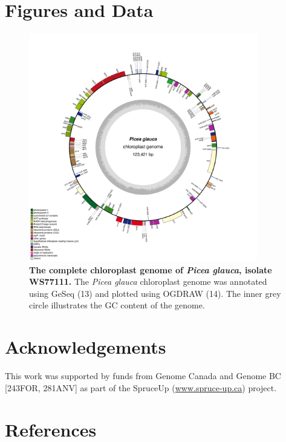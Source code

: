 \documentclass[titlepage,11pt, oneside]{article}   	%
\begin{document}
\section*{Figures and Data}
\begin{figure}[h]
\centering
\includegraphics[width=0.889\textwidth]{WS77111}
\caption{\textbf{The complete chloroplast genome of \textit{Picea glauca}, isolate WS77111.} The \textit{Picea glauca} chloroplast genome was annotated using GeSeq (13) and plotted using OGDRAW (14). The inner grey circle illustrates the GC content of the genome.}
\label{fig:ogdraw}
\end{figure}

\section*{Acknowledgements}
This work was supported by funds from Genome Canada and Genome BC [243FOR, 281ANV] as part of the SpruceUp (\url{www.spruce-up.ca}) project.

\section*{References}
\end{document}
